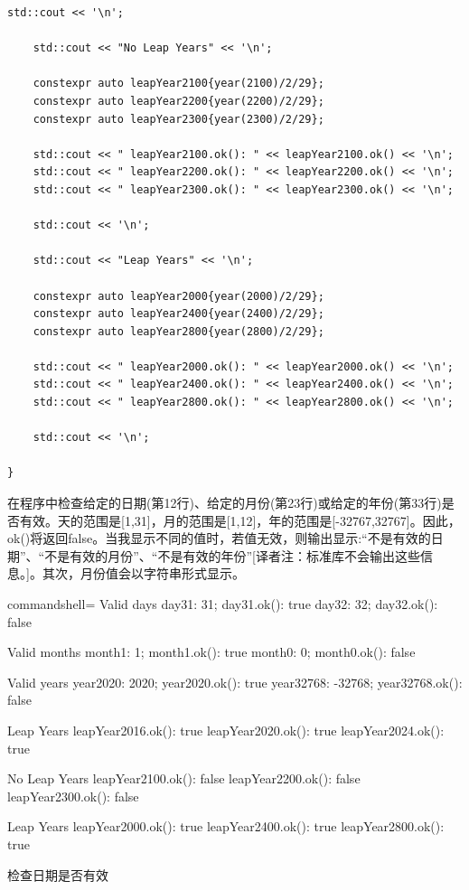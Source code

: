 \begin{lstlisting}[style=styleCXX]
	std::cout << '\n';
	
	std::cout << "No Leap Years" << '\n';
	
	constexpr auto leapYear2100{year(2100)/2/29};
	constexpr auto leapYear2200{year(2200)/2/29};
	constexpr auto leapYear2300{year(2300)/2/29};
	
	std::cout << " leapYear2100.ok(): " << leapYear2100.ok() << '\n';
	std::cout << " leapYear2200.ok(): " << leapYear2200.ok() << '\n';
	std::cout << " leapYear2300.ok(): " << leapYear2300.ok() << '\n';
	
	std::cout << '\n';
	
	std::cout << "Leap Years" << '\n';
	
	constexpr auto leapYear2000{year(2000)/2/29};
	constexpr auto leapYear2400{year(2400)/2/29};
	constexpr auto leapYear2800{year(2800)/2/29};
	
	std::cout << " leapYear2000.ok(): " << leapYear2000.ok() << '\n';
	std::cout << " leapYear2400.ok(): " << leapYear2400.ok() << '\n';
	std::cout << " leapYear2800.ok(): " << leapYear2800.ok() << '\n';
	
	std::cout << '\n';
	
}
\end{lstlisting}

在程序中检查给定的日期(第12行)、给定的月份(第23行)或给定的年份(第33行)是否有效。天的范围是[1,31]，月的范围是[1,12]，年的范围是[-32767,32767]。因此，ok()将返回false。当我显示不同的值时，若值无效，则输出显示:“不是有效的日期”、“不是有效的月份”、“不是有效的年份”[译者注：标准库不会输出这些信息。]。其次，月份值会以字符串形式显示。

\begin{tcblisting}{commandshell={}}
Valid days
  day31: 31; day31.ok(): true
  day32: 32; day32.ok(): false

Valid months
  month1: 1; month1.ok(): true
  month0: 0; month0.ok(): false

Valid years
  year2020: 2020; year2020.ok(): true
  year32768: -32768; year32768.ok(): false

Leap Years
  leapYear2016.ok(): true
  leapYear2020.ok(): true
  leapYear2024.ok(): true

No Leap Years
  leapYear2100.ok(): false
  leapYear2200.ok(): false
  leapYear2300.ok(): false

Leap Years
  leapYear2000.ok(): true
  leapYear2400.ok(): true
  leapYear2800.ok(): true
\end{tcblisting}

\begin{center}
检查日期是否有效
\end{center}

